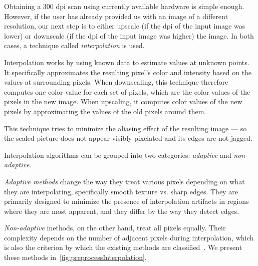 Obtaining a 300 dpi scan using currently available hardware is simple enough. However, if the user has already provided us with an image of a different resolution, our next step is to either upscale (if the dpi of the input image was lower) or downscale (if the dpi of the input image was higher) the image. In both cases, a technique called \emph{interpolation} is used. 

Interpolation works by using known data to estimate values at unknown points. It specifically approximates the resulting pixel's color and intensity based on the values at surrounding pixels. When downscaling, this technique therefore computes one color value for each set of pixels, which are the color values of the pixels in the new image. When upscaling, it computes color values of the new pixels by approximating the values of the old pixels around them.

This technique tries to minimize the aliasing effect of the resulting image --- so the scaled picture does not appear visibly pixelated and its edges are not jagged.

Interpolation algorithms can be grouped into two categories: \emph{adaptive} and \emph{non-adaptive}.

\emph{Adaptive methods} change the way they treat various pixels depending on what they are interpolating, specifically smooth texture vs. sharp edges. They are primarily designed to minimize the presence of interpolation artifacts in regions where they are most apparent, and they differ by the way they detect edges.

\emph{Non-adaptive} methods, on the other hand, treat all pixels equally. Their complexity depends on the number of adjacent pixels during interpolation, which is also the criterion by which the existing methods are classified~\cite{interpolation}. We present these methods in~\cref{fig:preprocessInterpolation}.

